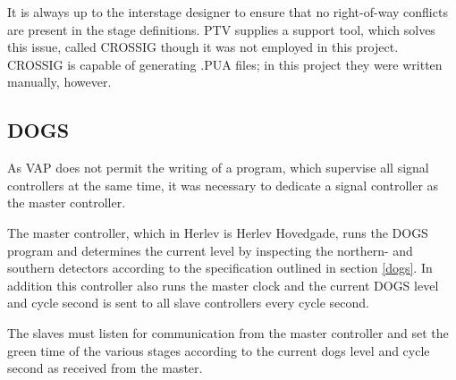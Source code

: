 It is always up to the interstage designer to ensure that no right-of-way conflicts are present in the stage definitions. PTV supplies a support tool, which solves this issue, called CROSSIG though it was not employed in this project. CROSSIG is capable of generating .PUA files; in this project they were written manually, however.

\subsection{DOGS}
As VAP does not permit the writing of a program, which supervise all signal controllers at the same time, it was necessary to dedicate a signal controller as the master controller.

The master controller, which in Herlev is Herlev Hovedgade, runs the DOGS program and determines the current level by inspecting the northern- and southern detectors according to the specification outlined in section \ref{dogs}. In addition this controller also runs the master clock and the current DOGS level and cycle second is sent to all slave controllers every cycle second.

The slaves must listen for communication from the master controller and set the green time of the various stages according to the current dogs level and cycle second as received from the master.